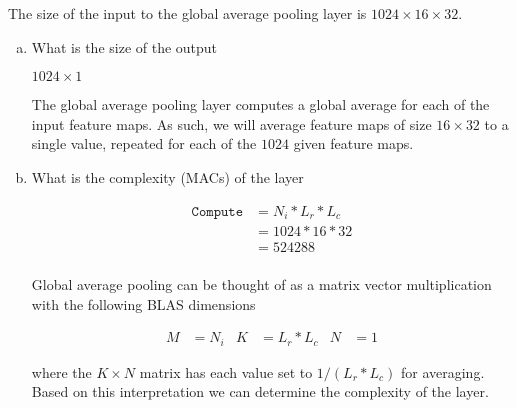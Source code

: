 \documentclass[11pt]{article}
\begin{document}
The size of the input to the global average pooling layer is
$1024\times16\times32$.
\begin{enumerate}[(a)]\itemsep0pt
	\item What is the size of the output
		\begin{solution}
			$1024 \times 1$

			The global average pooling layer computes a global average for each
			of the input feature maps. As such, we will average
			feature maps of size $16\times32$ to a single value, repeated for
			each of the $1024$ given feature maps.
		\end{solution}
	\item What is the complexity (MACs) of the layer
		\begin{solution}
			\begin{align}
				\texttt{Compute} &= N_i * L_r * L_c \\
					&= 1024*16*32 \\
					&= 524288 \\
			\end{align}

			Global average pooling can be thought of as a matrix vector
			multiplication with the following BLAS dimensions

			\begin{align}
				M &= N_i & K &= L_r * L_c & N &= 1
			\end{align}

			where the $K\times N$ matrix has each value set to $1/(L_r * L_c)$
			for averaging. Based on this interpretation we can determine the
			complexity of the layer.

		\end{solution}
\end{enumerate}
\end{document}
